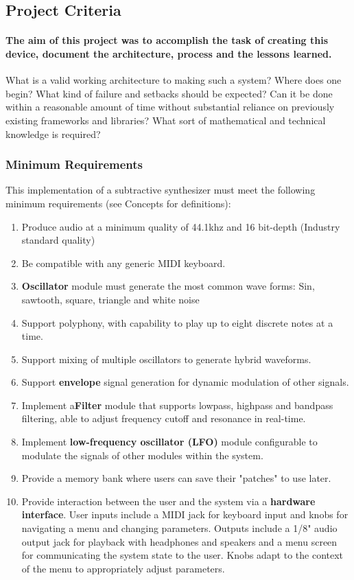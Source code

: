 \documentclass[acmlarge,screen]{acmart}
\begin{document}
\subsection{Project Criteria}
	\paragraph{The aim of this project was to accomplish the task of creating this device, document the architecture, process and the lessons learned.}What is a valid working architecture to making such a system? Where does one begin? What kind of failure and setbacks should be expected? Can it be done within a reasonable amount of time without substantial reliance on previously existing frameworks and libraries? What sort of mathematical and technical knowledge is required?
	\subsubsection{Minimum Requirements}
	\label{requirements}
	This implementation of a subtractive synthesizer must meet the following minimum requirements (see Concepts for definitions):
	\begin{enumerate}
		\item Produce audio at a minimum quality of 44.1khz and 16 bit-depth (Industry standard quality)
		\item Be compatible with any generic MIDI keyboard.
		\item \textbf{Oscillator} module must generate the most common wave forms: Sin, sawtooth, square, triangle and white noise
		\item Support polyphony, with capability to play up to eight discrete notes at a time.
		\item Support mixing of multiple oscillators to generate hybrid waveforms.
		\item Support \textbf{envelope} signal generation for dynamic modulation of other signals.
		\item Implement a\textbf{Filter} module that supports lowpass, highpass and bandpass filtering, able to adjust frequency cutoff and resonance in real-time.
		\item Implement \textbf{low-frequency oscillator (LFO)} module configurable to modulate the signals of other modules within the system.
		\item Provide a memory bank where users can save their "patches" to use later.
		\item Provide interaction between the user and the system via a \textbf{hardware interface}. User inputs include a MIDI jack for keyboard input and knobs for navigating a menu and changing parameters. Outputs include a 1/8" audio output jack for playback with headphones and speakers and a menu screen for communicating the system state to the user. Knobs adapt to the context of the menu to appropriately adjust parameters.
	\end{enumerate}
	
\end{document}
